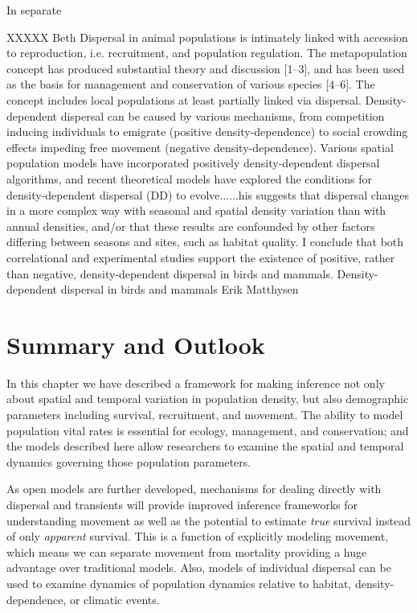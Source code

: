 In separate


XXXXX Beth 
Dispersal in animal populations is intimately linked with accession to reproduction, i.e. recruitment, and population regulation. The metapopulation concept has produced substantial theory and discussion [1–3], and has been used as the basis for management and conservation of various species [4–6]. The concept includes local populations at least partially linked via dispersal.
Density-dependent dispersal can be caused by various mechanisms, from competition inducing individuals to emigrate (positive density-dependence) to social crowding effects impeding free movement (negative density-dependence). Various spatial population models have incorporated positively density-dependent dispersal algorithms, and recent theoretical models have explored the conditions for density-dependent dispersal (DD) to evolve......his suggests that dispersal changes in a more complex way with seasonal and spatial density variation than with annual densities, and/or that these results are confounded by other factors differing between seasons and sites, such as habitat quality. I conclude that both correlational and experimental studies support the existence of positive, rather than negative, density-dependent dispersal in birds and mammals.  Density-dependent dispersal in birds and mammals  Erik Matthysen


\section{Summary and Outlook}

In this chapter we have described a framework for making inference not only about
spatial and temporal variation in population density, but also demographic
parameters including survival, recruitment, and movement. The ability to
model population vital rates is essential for ecology, management, and
conservation;
and the models described here allow researchers to examine the spatial
and temporal dynamics governing those population parameters.

As open models are further developed, mechanisms for dealing directly with
dispersal and transients will provide improved inference frameworks for
understanding movement as well as the potential to estimate {\it true} survival instead
of only {\it apparent} survival.
This is a function of explicitly modeling movement, which means we can
separate movement from mortality providing a huge advantage over traditional models.  Also,
models of individual dispersal can be used to examine dynamics of population dynamics relative
to habitat, density-dependence, or climatic events.

